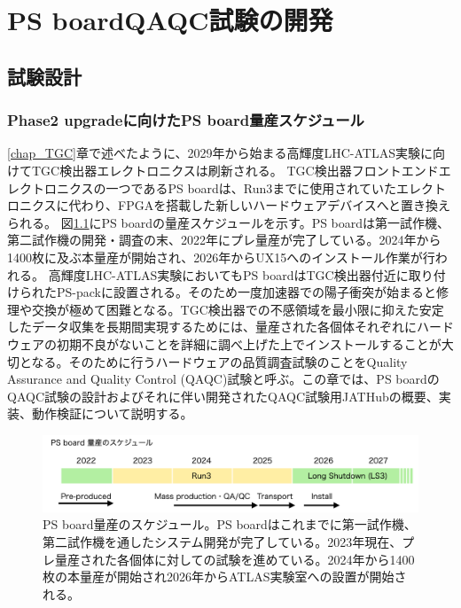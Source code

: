 \chapter{PS boardQAQC試験の開発}
\label{chap_QAQC}

\section{試験設計}
\label{sec_QAQCdesign}
\subsection{Phase2 upgradeに向けたPS board量産スケジュール}
\label{subsec_PSBschedule}
\ref{chap_TGC}章で述べたように、2029年から始まる高輝度LHC-ATLAS実験に向けてTGC検出器エレクトロニクスは刷新される。
TGC検出器フロントエンドエレクトロニクスの一つであるPS boardは、Run3までに使用されていたエレクトロニクスに代わり、FPGAを搭載した新しいハードウェアデバイスへと置き換えられる。
図\ref{PSBschedule}にPS boardの量産スケジュールを示す。PS boardは第一試作機、第二試作機の開発・調査の末、2022年にプレ量産が完了している。2024年から1400枚に及ぶ本量産が開始され、2026年からUX15へのインストール作業が行われる。
高輝度LHC-ATLAS実験においてもPS boardはTGC検出器付近に取り付けられたPS-packに設置される。そのため一度加速器での陽子衝突が始まると修理や交換が極めて困難となる。TGC検出器での不感領域を最小限に抑えた安定したデータ収集を長期間実現するためには、量産された各個体それぞれにハードウェアの初期不良がないことを詳細に調べ上げた上でインストールすることが大切となる。そのために行うハードウェアの品質調査試験のことをQuality Assurance and Quality Control (QAQC)試験と呼ぶ。この章では、PS boardのQAQC試験の設計およびそれに伴い開発されたQAQC試験用JATHubの概要、実装、動作検証について説明する。

\begin{figure} 
\centering
\includegraphics[width=16cm]{fig/QAQC/PSBschedule.png}
\caption[PS board量産のスケジュール]{PS board量産のスケジュール。PS boardはこれまでに第一試作機、第二試作機を通したシステム開発が完了している。2023年現在、プレ量産された各個体に対しての試験を進めている。2024年から1400枚の本量産が開始され2026年からATLAS実験室への設置が開始される。}
\label{PSBschedule}
\end{figure}

